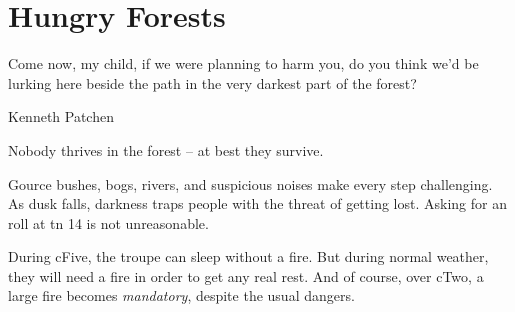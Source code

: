 \chapter{Hungry Forests}
\epigraph{Come now, my child, if we were planning to harm you, do you think we'd be lurking here beside the path in the very darkest part of the forest?}{Kenneth Patchen}

\label{forestChapter}

\noindent
Nobody thrives in the forest -- at best they survive.

Gource bushes, bogs, rivers, and suspicious noises make every step challenging.
As dusk falls, darkness traps people with the threat of getting lost.
Asking for an  roll at \gls{tn} 14 is not unreasonable.

During \gls{cFive}, the troupe can sleep without a fire.
But during normal weather, they will need a fire in order to get any real rest.
And of course, over \gls{cTwo}, a large fire becomes \emph{mandatory}, despite the usual dangers.%
